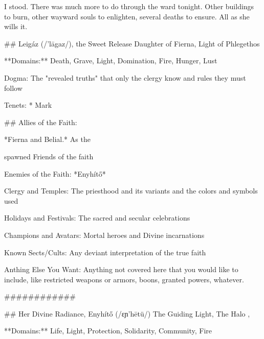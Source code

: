 I stood.
There was much more to do through the ward tonight.
Other buildings to burn, other wayward souls to enlighten, several deaths to ensure.
All as she wills it.





## Leigáz (/'lāgaz/), the Sweet Release
Daughter of Fierna, Light of Phlegethos

**Domains:** Death, Grave, Light, Domination, Fire, Hunger, Lust

Dogma:
The "revealed truths" that only the clergy know and rules they must follow

Tenets:
* Mark

## Allies of the Faith:

*Fierna and Belial.*
As the

spawned
Friends of the faith

Enemies of the Faith:
*Enyhítő*

Clergy and Temples: The priesthood and its variants and the colors and symbols used

Holidays and Festivals: The sacred and secular celebrations

Champions and Avatars: Mortal heroes and Divine incarnations

Known Sects/Cults: Any deviant interpretation of the true faith

Anthing Else You Want: Anything not covered here that you would like to include, like restricted weapons or armors, boons, granted powers, whatever.



############

## Her Divine Radiance, Enyhítő (/ɛɲ'hētü/)
The Guiding Light, The Halo ,

**Domains:** Life, Light, Protection, Solidarity, Community, Fire

